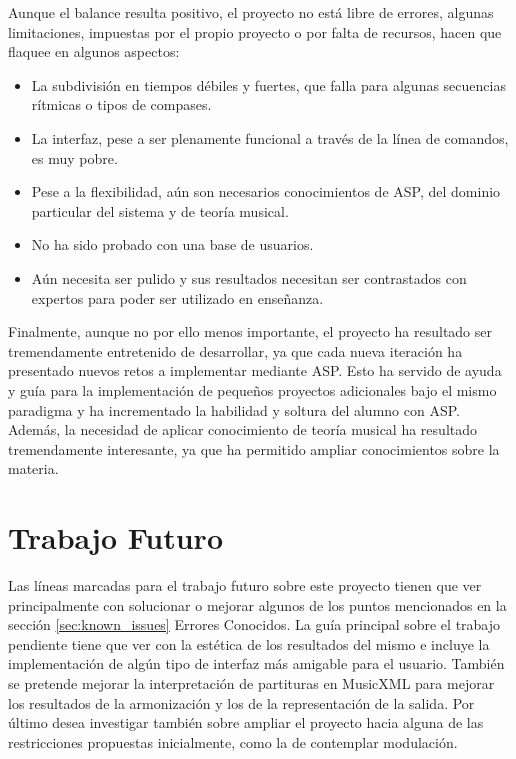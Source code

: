 Aunque el balance resulta positivo, el proyecto no está libre de errores, algunas limitaciones, impuestas por el propio proyecto o por falta de recursos, hacen que flaquee en algunos aspectos:
\begin{itemize}
	\item La subdivisión en tiempos débiles y fuertes, que falla para algunas secuencias rítmicas o tipos de compases.
	\item La interfaz, pese a ser plenamente funcional a través de la línea de comandos, es muy pobre.
	\item Pese a la flexibilidad, aún son necesarios conocimientos de ASP, del dominio particular del sistema y de teoría musical.
	\item No ha sido probado con una base de usuarios.
	\item Aún necesita ser pulido y sus resultados necesitan ser contrastados con expertos para poder ser utilizado en enseñanza.
\end{itemize} 

Finalmente, aunque no por ello menos importante, el proyecto ha resultado ser tremendamente entretenido de desarrollar, ya que cada nueva iteración ha presentado nuevos retos a implementar mediante ASP. Esto ha servido de ayuda y guía para la implementación de pequeños proyectos adicionales bajo el mismo paradigma y ha incrementado la habilidad y soltura del alumno con ASP. Además, la necesidad de aplicar conocimiento de teoría musical ha resultado tremendamente interesante, ya que ha permitido ampliar conocimientos sobre la materia.
 
\section{Trabajo Futuro}
\label{sec:future_work}
Las líneas marcadas para el trabajo futuro sobre este proyecto tienen que ver principalmente con solucionar o mejorar algunos de los puntos mencionados en la sección \ref{sec:known_issues} Errores Conocidos. La guía principal sobre el trabajo pendiente tiene que ver con la estética de los resultados del mismo e incluye la implementación de algún tipo de interfaz más amigable para el usuario. También se pretende mejorar la interpretación de partituras en MusicXML para mejorar los resultados de la armonización y los de la representación de la salida. Por último desea investigar también sobre ampliar el proyecto hacia alguna de las restricciones propuestas inicialmente, como la de contemplar modulación.

